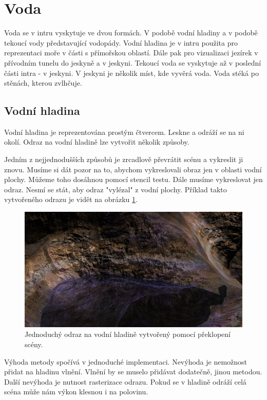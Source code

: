 
\section{Voda}
Voda se v intru vyskytuje ve dvou formách.
V podobě vodní hladiny a v podobě tekoucí vody představující vodopády.
Vodní hladina je v intru použita pro reprezentaci moře v části s přímořskou oblastí.
Dále pak pro vizualizaci jezírek v přívodním tunelu do jeskyně a v jeskyni.
Tekoucí voda se vyskytuje až v poslední části intra - v jeskyni.
V jeskyni je několik míst, kde vyvěrá voda.
Voda stéká po stěnách, kterou zvlhčuje.

\subsection{Vodní hladina}
Vodní hladina je reprezentována prostým čtvercem.
Leskne a odráží se na ni okolí.
Odraz na vodní hladině lze vytvořit několik způsoby.

Jedním z nejjednodušších způsobů je zrcadlově převrátit scénu a vykreslit ji znovu.
Musíme si dát pozor na to, abychom vykreslovali obraz jen v oblasti vodní plochy.
Můžeme toho dosáhnou pomocí stencil testu.
Dále musíme vykreslovat jen odraz.
Nesmí se stát, aby odraz "vylézal" z vodní plochy.
Příklad takto vytvořeného odrazu je vidět na obrázku \ref{fig:reflex0}.
\begin{figure}[h]
\centering
\includegraphics[width=15cm,keepaspectratio]{obr/reflex0.jpg}
\caption{Jednoduchý odraz na vodní hladině vytvořený pomocí překlopení scény.}
\label{fig:reflex0}
\end{figure}
Výhoda metody spočívá v jednoduché implementaci.
Nevýhoda je nemožnost přidat na hladinu vlnění.
Vlnění by se muselo přidávat dodatečně, jinou metodou.
Další nevýhoda je nutnost rasterizace odrazu.
Pokud se v hladině odráží celá scéna může nám výkon klesnou i na polovinu.

